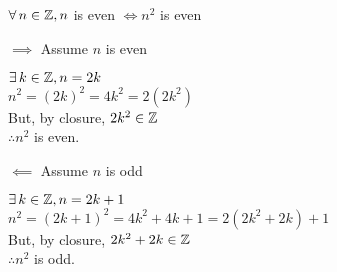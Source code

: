 \documentclass[letterpaper,12pt,fleqn]{article}
\begin{document}
\begin{theorem}
  $\forall\,n\in\mathbb{Z},n$ is even $\iff n^2$ is even
\end{theorem}

\begin{theproof}
  \listbreak
  \begin{description}
  \item $\implies$ Assume $n$ is even

    $\exists\,k\in\mathbb{Z},n=2k$ \\
    $n^2=(2k)^2=4k^2=2(2k^2)$ \\
    But, by closure, $2k^2\in\mathbb{Z}$ \\
    $\therefore n^2$ is even.

  \item $\impliedby$ Assume $n$ is odd

    $\exists\,k\in\mathbb{Z},n=2k+1$ \\
    $n^2=(2k+1)^2=4k^2+4k+1=2(2k^2+2k)+1$ \\
    But, by closure, $2k^2+2k\in\mathbb{Z}$ \\
    $\therefore n^2$ is odd.
  \end{description}
\end{theproof}
\end{document}
